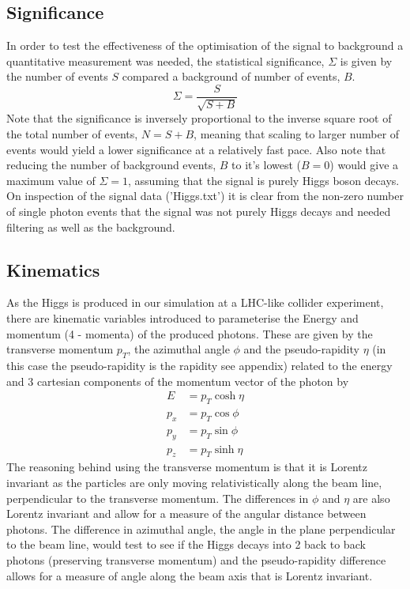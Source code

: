 \documentclass{article}
\begin{document}
\subsection{Significance}
In order to test the effectiveness of the optimisation of the signal to background a quantitative measurement was needed, the statistical significance, $\Sigma$ is given by the number of events $S$ compared a background of number of events, $B$.
\begin{equation}
\Sigma = \frac{S}{\sqrt{S + B}} 
\end{equation}
Note that the significance is inversely proportional to the inverse square root of the total number of events, $N = S + B$, meaning that scaling to larger number of events would yield a lower significance at a relatively fast pace. Also note that reducing the number of background events, $B$ to it's lowest ($B = 0$) would give a maximum value of $\Sigma = 1$, assuming that the signal is purely Higgs boson decays. On inspection of the signal data ('Higgs.txt') it is clear from the non-zero number of single photon events that the signal was not purely Higgs decays and needed filtering as well as the background. 
\subsection{Kinematics}
As the Higgs is produced in our simulation at a LHC-like collider experiment, there are kinematic variables introduced to parameterise the Energy and momentum (4 - momenta) of the produced photons. These are given by the transverse momentum $p_T$, the azimuthal angle $\phi$ and the pseudo-rapidity $\eta$ (in this case the pseudo-rapidity is the rapidity see appendix) related to the energy and 3 cartesian components of the momentum vector of the photon by
\begin{align}
E &= p_T \cosh {\eta} \\
p_x &= p_T \cos{\phi} \\
p_y &= p_T \sin{\phi} \\
p_z &= p_T \sinh{\eta}
\end{align}
The reasoning behind using the transverse momentum is that it is Lorentz invariant as the particles are only moving relativistically along the beam line, perpendicular to the transverse momentum. The differences in $\phi$ and $\eta$ are also Lorentz invariant and allow for a measure of the angular distance between photons. The difference in azimuthal angle, the angle in the plane perpendicular to the beam line, would test to see if the Higgs decays into 2 back to back photons (preserving transverse momentum) and the pseudo-rapidity difference allows for a measure of angle along the beam axis that is Lorentz invariant.
\end{document}
